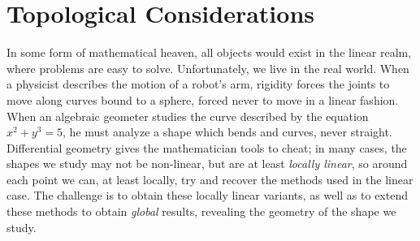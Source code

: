 \begin{comment}
In our case, we wish to specialize the study of topological curves to curves with a well defined tangent line. In this case, curves like $c(t) = |t|^{1/2}$ will not have the properties we wish to study, since the curve has no tangent line at zero. We define a differentiable curve of order $C^k$  in terms of parameterizations $c: I \to \RR$ which are $C^k$, in the sense that the first $k$ derivatives of $c^1$ and $c^2$ are continuous. Of course, we identify these parameterizations if they have a reparameterization which is also $C^k$, and this gives us the general definition we desire. The term {\bf smooth} is often reserved for the differentiable curves of order $C^\infty$.

\begin{example}
    The {\bf Spiral of Archimedes} can be thought of as the smooth curve defined in polar coordinates by the equation $r = \theta$, which also has the parameterization $c: (0,\infty) \to \RR^2$ defined by $c(t) = (t \cos t, t \sin t)$. One can synthetically find the tangent line at a point $P$ on the spiral of archimedes by considering a point $Q$ on $OP$ a unit length from $OQ$, rotating $P$ by a right angle anticlockwise to form the point $R$, and then considering the line through $P$ parallel to $QR$.
\end{example}
\end{comment}

\chapter{Topological Considerations}

In some form of mathematical heaven, all objects would exist in the linear realm, where problems are easy to solve. Unfortunately, we live in the real world.  When a physicist describes the motion of a robot's arm, rigidity forces the joints to move along curves bound to a sphere, forced never to move in a linear fashion. When an algebraic geometer studies the curve described by the equation $x^2 + y^3 = 5$, he must analyze a shape which bends and curves, never straight. Differential geometry gives the mathematician tools to cheat; in many cases, the shapes we study may not be non-linear, but are at least {\it locally linear}, so around each point we can, at least locally, try and recover the methods used in the linear case. The challenge is to obtain these locally linear variants, as well as to extend these methods to obtain \emph{global} results, revealing the geometry of the shape we study.

